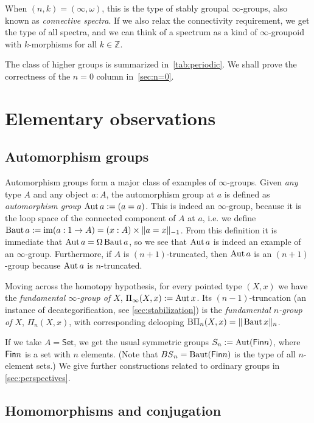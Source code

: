 When $(n,k)=(\infty,\omega)$, this is the type of stably groupal $\infty$-groups,
also known as \emph{connective spectra}. If we also relax the
connectivity requirement, we get the type of all spectra, and we can
think of a spectrum as a kind of $\infty$-groupoid with $k$-morphisms
for all $k\in\mathbb{Z}$.

The class of higher groups is summarized in~\autoref{tab:periodic}.
We shall prove the correctness of the $n=0$ column in~\autoref{sec:n=0}.

\section{Elementary observations}
\label{sec:elementary-theory}

\subsection{Automorphism groups}
Automorphism groups form a major class of examples of $\infty$-groups.
Given \emph{any} type $A$ and any object $a : A$, the automorphism group at $a$ is defined as
\emph{automorphism group} $\Aut a:=(a=a)$. 
This is indeed an $\infty$-group, because it is the loop space of the connected component of $A$ at $a$, i.e. we define~$\BAut a := \im(a : 1 \to A) = (x : A) \times \trunc{-1}{a=x}$.
From this definition it is immediate that $\Aut a=\Omega\BAut a$, so we see that $\Aut a$ is indeed an example of an $\infty$-group. 
Furthermore, if $A$ is $(n+1)$-truncated, then $\Aut a$ is an $(n+1)$-group because $\Aut a$ is $n$-truncated.

Moving across the homotopy hypothesis, for every pointed type $(X,x)$
we have the \emph{fundamental $\infty$-group of $X$},
$\Pi_\infty(X,x):=\Aut x$. Its $(n-1)$-truncation (an instance of
decategorification, see \autoref{sec:stabilization}) is the
\emph{fundamental $n$-group of $X$}, $\Pi_n(X,x)$,
with corresponding delooping $\mathrm{B}\Pi_n(X,x) = \trunc{n}{\BAut x}$.

If we take $A = \mathsf{Set}$, we get the usual symmetric groups
$\Sym_n := \Aut(\Fin n)$, where $\Fin n$ is a set with $n$
elements. (Note that $\BS_n = \BAut(\Fin n)$ is the type of all
$n$-element sets.)
We give further constructions related to ordinary groups
in \autoref{sec:perspectives}.

\subsection{Homomorphisms and conjugation}
\label{sec:homomorphisms}

